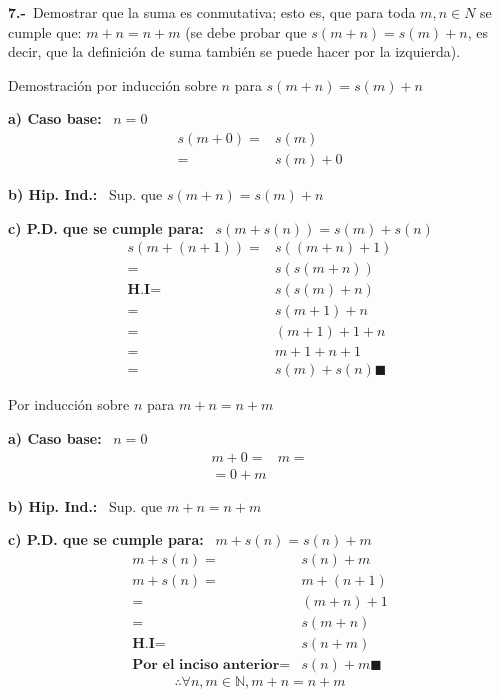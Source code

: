 \textbf{7.-}\ Demostrar que la suma es conmutativa; esto es, que para toda $m,n \in N$ se cumple que: $m + n = n + m$ (se debe probar que $s(m + n) = s(m) + n$, es decir, que la definición de suma también se puede hacer por la izquierda).

Demostración por inducción sobre $n$ para $s(m + n) = s(m) + n$

\textbf{a) Caso base: }\ $n=0$
\begin{align}
    s(m+0)=&s(m)\\
          =&s(m)+0
\end{align}

\textbf{b) Hip. Ind.: }\ Sup. que $s(m + n) = s(m) + n$

\textbf{c) P.D. que se cumple para: }\ $s(m + s(n)) = s(m) + s(n)$
\begin{align}
    s(m+(n+1))=&s((m+n)+1)\\
    =&s(s(m+n))\\
    \textbf{H.I}=&s(s(m)+n)\\
    =&s(m+1)+n\\
    =&(m+1)+1+n\\
    =&m+1+n+1\\
    =&s(m)+s(n) \blacksquare
\end{align}

Por inducción sobre $n$ para $m + n = n + m$

\textbf{a) Caso base: }\ $n=0$
\begin{align}
    m+0=&m=\\
          =0+m
\end{align}

\textbf{b) Hip. Ind.: }\ Sup. que $m + n = n + m$

\textbf{c) P.D. que se cumple para: }\ $m + s(n) = s(n) + m$
\begin{align}
    m+s(n)=&s(n)+m\\
    m+s(n)=&m+(n+1)\\
          =&(m+n)+1\\
          =&s(m+n)\\
    \textbf{H.I}=&s(n+m)\\
    \textbf{Por el inciso anterior}=&s(n)+m\blacksquare
\end{align}
$$\therefore \forall n,m\in \mathbb{N}, m+n=n+m$$
